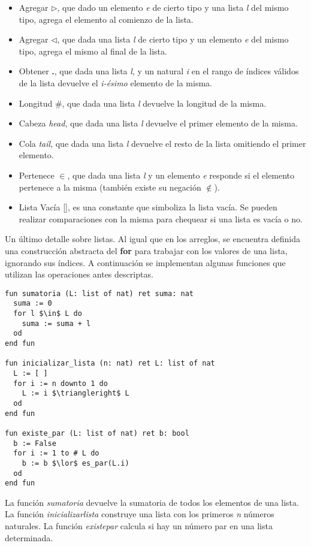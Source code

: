\documentclass{article}
\begin{document}
\begin{itemize}
\item Agregar $\triangleright$, que dado un elemento \textit{e} de cierto tipo y una lista \textit{l} del mismo tipo, agrega el elemento al comienzo de la lista.
\item Agregar $\triangleleft$, que dada una lista \textit{l} de cierto tipo y un elemento \textit{e} del mismo tipo, agrega el mismo al final de la lista.
\item Obtener \textbf{.}, que dada una lista \textit{l}, y un natural \textit{i} en el rango de índices válidos de la lista devuelve el \textit{i-ésimo} elemento de la misma.
\item Longitud \#, que dada una lista \textit{l} devuelve la longitud de la misma.
\item Cabeza \textit{head}, que dada una lista \textit{l} devuelve el primer elemento de la misma.
\item Cola \textit{tail}, que dada una lista \textit{l} devuelve el resto de la lista omitiendo el primer elemento.
\item Pertenece $\in$, que dada una lista \textit{l} y un elemento \textit{e} responde si el elemento pertenece a la misma (también existe su negación $\notin$).
\item Lista Vacía [\space], es una constante que simboliza la lista vacía.
Se pueden realizar comparaciones con la misma para chequear si una lista es vacía o no.
\end{itemize}

Un último detalle sobre listas.
Al igual que en los arreglos, se encuentra definida una construcción abstracta del \textbf{for} para trabajar con los valores de una lista, ignorando sus índices.
A continuación se implementan algunas funciones que utilizan las operaciones antes descriptas.

\begin{lstlisting}
fun sumatoria (L: list of nat) ret suma: nat
  suma := 0
  for l $\in$ L do
    suma := suma + l
  od
end fun

fun inicializar_lista (n: nat) ret L: list of nat
  L := [ ]
  for i := n downto 1 do
    L := i $\triangleright$ L
  od
end fun

fun existe_par (L: list of nat) ret b: bool
  b := False
  for i := 1 to # L do
    b := b $\lor$ es_par(L.i)
  od
end fun
\end{lstlisting}

La función \textit{sumatoria} devuelve la sumatoria de todos los elementos de una lista.
La función \textit{inicializar\gbajo lista} construye una lista con los primeros \textit{n} números naturales.
La función \textit{existe\gbajo par} calcula si hay un número par en una lista determinada.
\end{document}
